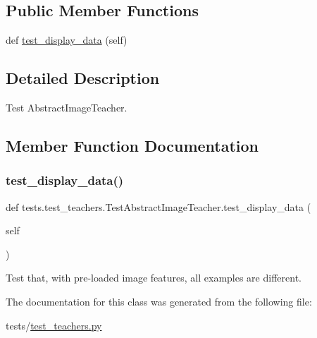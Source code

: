 \subsection*{Public Member Functions}
\begin{DoxyCompactItemize}
\item 
def \hyperlink{classtests_1_1test__teachers_1_1TestAbstractImageTeacher_a7858e68d96209268ee2cfcf23030b7b7}{test\+\_\+display\+\_\+data} (self)
\end{DoxyCompactItemize}


\subsection{Detailed Description}
\begin{DoxyVerb}Test AbstractImageTeacher.
\end{DoxyVerb}
 

\subsection{Member Function Documentation}
\mbox{\label{classtests_1_1test__teachers_1_1TestAbstractImageTeacher_a7858e68d96209268ee2cfcf23030b7b7}} 
\subsubsection{\texorpdfstring{test\+\_\+display\+\_\+data()}{test\_display\_data()}}
{\footnotesize\ttfamily def tests.\+test\+\_\+teachers.\+Test\+Abstract\+Image\+Teacher.\+test\+\_\+display\+\_\+data (\begin{DoxyParamCaption}\item[{}]{self }\end{DoxyParamCaption})}

\begin{DoxyVerb}Test that, with pre-loaded image features, all examples are different.
\end{DoxyVerb}
 

The documentation for this class was generated from the following file\+:\begin{DoxyCompactItemize}
\item 
tests/\hyperlink{test__teachers_8py}{test\+\_\+teachers.\+py}\end{DoxyCompactItemize}
